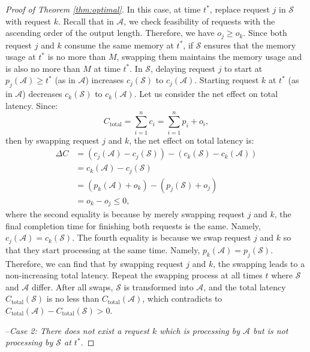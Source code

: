 \documentclass[11pt, a4paper]{article}
\theoremstyle{plain}
\theoremstyle{definition}
\theoremstyle{remark}
\begin{document}
\begin{proof}[Proof of Theorem \ref{thm:optimal}]
In this case, at time \( t^* \), replace request \( j \) in \( \mathcal{S} \) with request \( k \). Recall that in $\mathcal{A}$, we check feasibility of requests with the ascending order of the output length. Therefore, we have $o_j \geq o_k$. Since both request $j$ and $k$ consume the same memory at \( t^* \), if \( \mathcal{S} \) ensures that the memory usage at \( t^* \) is no more than $M$, swapping them maintains the memory usage and is also no more than $M$ at time $t^{*}$. In \( \mathcal{S} \), delaying request \( j \) to start at \( p_j(\mathcal{A}) \geq t^* \) (as in \( \mathcal{A} \)) increases \( c_j(\mathcal{S}) \) to \( c_j(\mathcal{A}) \). Starting request \( k \) at \( t^* \) (as in \( \mathcal{A} \)) decreases \( c_k(\mathcal{S}) \) to \( c_k(\mathcal{A}) \). Let us consider the net effect on total latency. Since: 
\[
    C_{\text{total}} = \sum_{i=1}^{n} c_i = \sum_{i=1}^{n} p_i + o_i,
\]
then by swapping request $j$ and $k$, the net effect on total latency is: 
\begin{align*}
\Delta C &= (c_j(\mathcal{A}) - c_j(\mathcal{S})) - (c_k(\mathcal{S}) - c_k(\mathcal{A})) \\&= c_k(\mathcal{A}) - c_j(\mathcal{S}) \\&= (p_k(\mathcal{A}) + o_k) - (p_j(\mathcal{S}) + o_j) \\&= o_k - o_j \leq 0,
\end{align*}
where the second equality is because by merely swapping request $j$ and $k$, the final completion time for finishing both requests is the same. Namely, $c_j(\mathcal{A}) = c_k(\mathcal{S})$. The fourth equality is because we swap request $j$ and $k$ so that they start processing at the same time. Namely, $p_k(\mathcal{A}) = p_j(\mathcal{S})$. Therefore, we can find that by swapping request $j$ and $k$, the swapping leads to a non-increasing total latency. Repeat the swapping process at all times \( t \) where \( \mathcal{S} \) and \( \mathcal{A} \) differ.  After all swaps, \( \mathcal{S} \) is transformed into \( \mathcal{A} \), and the total latency \( C_{\text{total}}(\mathcal{S}) \) is no less than \( C_{\text{total}}(\mathcal{A}) \), which contradicts to \(C_{\text{total}}(\mathcal{A}) - C_{\text{total}}(\mathcal{S})>0 \).



--\textit{Case 2: There does not exist a request $k$ which is processing by \( \mathcal{A} \) but is not processing by \( \mathcal{S} \) at \( t^* \).}


\end{proof}
\end{document}
